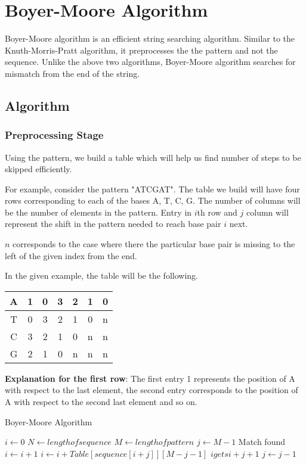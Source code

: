 \documentclass{article}
\begin{document}
\section{Boyer-Moore Algorithm}
Boyer-Moore algorithm is an efficient string searching algorithm. Similar to the Knuth-Morris-Pratt algorithm, it preprocesses the the pattern and not the sequence. Unlike the above two algorithms, Boyer-Moore algorithm searches for mismatch from the end of the string.

\subsection{Algorithm}
\subsubsection{Preprocessing Stage}
Using the pattern, we build a table which will help us find number of steps to be skipped efficiently.

For example, consider the pattern "ATCGAT". The table we build will have four rows corresponding to each of the bases A, T, C, G. The number of columns will be the number of elements in the pattern. Entry in $i$th row and $j$ column will represent the shift in the pattern needed to reach base pair $i$ next.

$n$ corresponds to the case where there the particular base pair is missing to the left of the given index from the end.


In the given example, the table will be the following. 
\noindent \begin{center}
\begin{tabular}{|c|c|c|c|c|c|c|}
\hline 
A & 1 & 0 & 3 & 2 & 1 & 0\tabularnewline
\hline 
T & 0 & 3 & 2 & 1 & 0 & n\tabularnewline
\hline 
C & 3 & 2 & 1 & 0 & n & n\tabularnewline
\hline 
G & 2 & 1 & 0 & n & n & n\tabularnewline
\hline 
\end{tabular}
\par\end{center}

\textbf{Explanation for the first row}: The first entry 1 represents the position of A with respect to the last element, the second entry corresponds to the position of A with respect to the second last element and so on.


\begin{algorithm}
\caption{Boyer-Moore Algorithm}\label{euclid}
\begin{algorithmic}[1]
\State $i \gets 0$
\State $N \gets length of sequence$
\State $M \gets length of pattern$
	\State $j \gets M - 1$
				\State Match found
				\State $i \gets i + 1$			
			\EndIf
  		\Else
  				\State $i \gets i + Table[sequence[i + j]][M-j-1]$
  			\Else
  				\State $i gets i + j + 1$
  			\EndIf
		\EndIf	
		\State $j \gets j - 1$	
	\EndWhile
\EndWhile
\EndProcedure
\end{algorithmic}
\end{algorithm}
\end{document}
